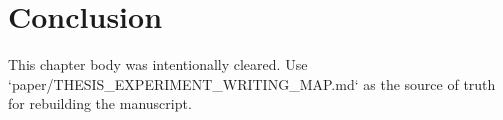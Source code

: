 \chapter{Conclusion}
\label{ch:conclusion}

This chapter body was intentionally cleared. Use `paper/THESIS_EXPERIMENT_WRITING_MAP.md` as the source of truth for rebuilding the manuscript.
